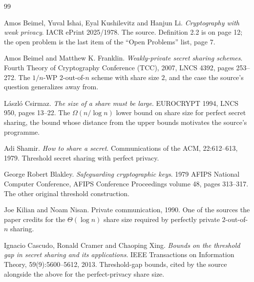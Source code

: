 \documentclass{aicr-conjecture}
\begin{document}
\begin{aicrbibliography}{99}

Amos Beimel, Yuval Ishai, Eyal Kushilevitz and Hanjun Li.
\emph{Cryptography with weak privacy}.
IACR ePrint 2025/1978.
The source. Definition 2.2 is on page 12; the open problem is the last
item of the ``Open Problems'' list, page 7.

Amos Beimel and Matthew K. Franklin.
\emph{Weakly-private secret sharing schemes}.
Fourth Theory of Cryptography Conference (TCC), 2007, LNCS 4392, pages
253--272.
The $1/n$-WP $2$-out-of-$n$ scheme with share size $2$, and the case the
source's question generalizes away from.

L\'aszl\'o Csirmaz.
\emph{The size of a share must be large}.
EUROCRYPT 1994, LNCS 950, pages 13--22.
The $\Omega(n/\log n)$ lower bound on share size for perfect secret
sharing, the bound whose distance from the upper bounds motivates the
source's programme.

Adi Shamir.
\emph{How to share a secret}.
Communications of the ACM, 22:612--613, 1979.
Threshold secret sharing with perfect privacy.

George Robert Blakley.
\emph{Safeguarding cryptographic keys}.
1979 AFIPS National Computer Conference, AFIPS Conference Proceedings
volume 48, pages 313--317.
The other original threshold construction.

Joe Kilian and Noam Nisan.
Private communication, 1990.
One of the sources the paper credits for the $\Theta(\log n)$ share size
required by perfectly private $2$-out-of-$n$ sharing.

Ignacio Cascudo, Ronald Cramer and Chaoping Xing.
\emph{Bounds on the threshold gap in secret sharing and its
applications}.
IEEE Transactions on Information Theory, 59(9):5600--5612, 2013.
Threshold-gap bounds, cited by the source alongside the above for the
perfect-privacy share size.

\end{aicrbibliography}
\end{document}

